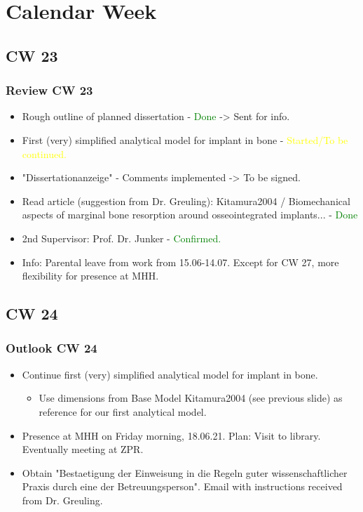 \section{Calendar Week}
\subsection{CW 23}
\begin{frame}
  \frametitle{Review CW 23}
	\begin{itemize}
	\item Rough outline of planned dissertation - \textcolor{green}{Done} -> Sent for info.
	\item First (very) simplified analytical model for implant in bone - \textcolor{yellow}{Started/To be continued.}
	\item "Dissertationanzeige" - Comments implemented -> To be signed.
	\item Read article (suggestion from Dr. Greuling): Kitamura2004 / Biomechanical aspects of marginal bone resorption around osseointegrated implants... - \textcolor{green}{Done}
	\item 2nd Supervisor: Prof. Dr. Junker - \textcolor{green}{Confirmed.}
	\item Info: Parental leave from work from 15.06-14.07. Except for CW 27, more flexibility for presence at MHH.
	
	\end{itemize}
\end{frame}
\subsection{CW 24}
\begin{frame}
  \frametitle{Outlook CW 24}
  \begin{itemize}
		\item Continue first (very) simplified analytical model for implant in bone.
		\begin{itemize}
			\item Use dimensions from Base Model Kitamura2004 (see previous slide) as reference for our first analytical model.
		\end{itemize}
		\item Presence at MHH on Friday morning, 18.06.21. Plan: Visit to library. Eventually meeting at ZPR.
		\item Obtain "Bestaetigung der Einweisung in die Regeln guter wissenschaftlicher Praxis durch eine der Betreuungsperson". Email with instructions received from Dr. Greuling.
	\end{itemize}
\end{frame}

